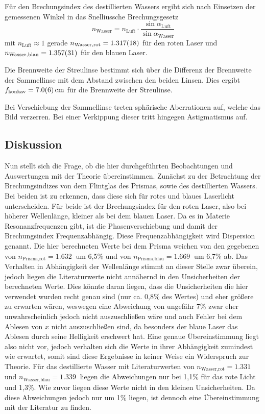 		Für den Brechungsindex des destillierten Wassers ergibt sich nach Einsetzen der gemessenen Winkel in das Snelliussche Brechungsgesetz
		\begin{equation}
			n_\text{Wasser} = n_\text{Luft} \cdot \frac{\sin \alpha_\text{Luft}}{\sin \alpha_\text{Wasser}} 
		\end{equation}
		mit $n_\text{Luft} \approx 1$ gerade $n_\text{Wasser,rot} = \SI{1.317+-0.018}{}$ für den roten Laser und $n_\text{Wasser,blau} = \SI{1.357+-0.031}{}$ für den blauen Laser.  
		
		Die Brennweite der Streulinse bestimmt sich über die Differenz der Brennweite der Sammellinse mit dem Abstand zwischen den beiden Linsen.
		Dies ergibt $f_\text{konkav} = \SI{7+-0,6}{\centi\meter}$ für die Brennweite der Streulinse.
		
		Bei Verschiebung der Sammellinse treten sphärische Aberrationen auf, welche das Bild verzerren.
		Bei einer Verkippung dieser tritt hingegen Astigmatismus auf.
		
	\subsection{Diskussion}
		
		Nun stellt sich die Frage, ob die hier durchgeführten Beobachtungen und Auswertungen mit der Theorie übereinstimmen.
		Zunächst zu der Betrachtung der Brechungsindizes von dem Flintglas des Prismas, sowie des destillierten Wassers.
		Bei beiden ist zu erkennen, dass diese sich für rotes und blaues Laserlicht unterscheiden.
		Für beide ist der Brechungsindex für den roten Laser, also bei höherer Wellenlänge, kleiner als bei dem blauen Laser.
		Da es in Materie Resonanzfrequenzen gibt, ist die Phasenverschiebung und damit der Brechungsindex Frequenzabhängig.
		Diese Frequenzabhängigkeit wird Dispersion genannt.
		Die hier berechneten Werte bei dem Prisma weichen von den gegebenen\cite{WWU} von $n_\text{Prisma,rot} = \SI{1,632}{}$ um 6,5\% und von $n_\text{Prisma,blau} = \SI{1,669}{}$ um 6,7\% ab.
		Das Verhalten in Abhängigkeit der Wellenlänge stimmt an dieser Stelle zwar überein, jedoch liegen die Literaturwerte nicht annähernd in den Unsicherheiten der berechneten Werte.
		Dies könnte daran liegen, dass die Unsicherheiten die hier verwendet wurden recht genau sind (nur ca. 0,8\% des Wertes) und eher größere zu erwarten wären, weswegen eine Abweichung von ungefähr 7\% zwar eher unwahrscheinlich jedoch nicht auszuschließen wäre und auch Fehler bei dem Ablesen von $x$ nicht auszuschließen sind, da besonders der blaue Laser das Ablesen durch seine Helligkeit erschwert hat.
		Eine genaue Übereinstimmung liegt also nicht vor, jedoch verhalten sich die Werte in ihrer Abhängigkeit zumindest wie erwartet, somit sind diese Ergebnisse in keiner Weise ein Widerspruch zur Theorie.
		Für das destillierte Wasser mit Literaturwerten\cite{Refrac} von $n_\text{Wasser,rot} = \SI{1.331}{}$ und $n_\text{Wasser,blau} = \SI{1.339}{}$ liegen die Abweichungen nur bei 1,1\% für das rote Licht und 1,3\%.
		Wie zuvor liegen diese Werte nicht in den kleinen Unsicherheiten.
		Da diese Abweichungen jedoch nur um 1\% liegen, ist dennoch eine Übereinstimmung mit der Literatur zu finden.
		
